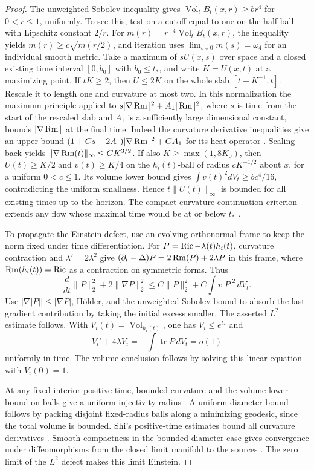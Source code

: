 \begin{proof}
The unweighted Sobolev inequality gives \(\operatorname{Vol}_t
B_t(x,r)\ge b r^4\) for \(0<r\le1\), uniformly. To see this, test
on a cutoff equal to one on the half-ball with Lipschitz constant
\(2/r\). For \(m(r)=r^{-4}\operatorname{Vol}_t B_t(x,r)\), the
inequality yields \(m(r)\ge c\sqrt{m(r/2)}\), and iteration uses
\(\lim_{s\downarrow0}m(s)=\omega_4\) for an individual smooth metric.
Take a maximum of \(sU(x,s)\) over space and a closed existing time
interval \([0,b_0]\) with \(b_0\le t_*\), and write \(K=U(x,t)\)
at a maximizing point. If \(tK\ge2\), then \(U\le2K\) on the
whole slab \([t-K^{-1},t]\). Rescale it to length one and curvature
at most two. In this normalization the maximum principle applied to
\(s|\nabla\operatorname{Rm}|^2+A_1|\operatorname{Rm}|^2\), where \(s\) is time from the start
of the rescaled slab and \(A_1\) is a sufficiently large dimensional
constant, bounds \(|\nabla\operatorname{Rm}|\) at the final time. Indeed the
curvature derivative inequalities give an upper bound
\((1+C s-2A_1)|\nabla\operatorname{Rm}|^2+C A_1\) for its heat operator
\cite[\S\S7 and 13]{Hamilton1982}. Scaling back yields
\(\|\nabla\operatorname{Rm}(t)\|_\infty\le C K^{3/2}\).
If also \(K\ge\max(1,8K_0)\), then \(U(t)\ge K/2\) and
\(v(t)\ge K/4\) on the \(h_i(t)\)-ball of radius \(cK^{-1/2}\)
about \(x\), for a uniform \(0<c\le1\). Its volume lower bound
gives \(\int v(t)^2dV_t\ge bc^4/16\), contradicting the uniform
smallness. Hence \(t\|U(t)\|_\infty\) is bounded for all existing
times up to the horizon. The compact curvature continuation criterion
extends any flow whose maximal time would be at or below \(t_*\)
\cite[Theorem~8.1]{HamiltonSingularities}.

To propagate the Einstein defect, use an evolving orthonormal frame
to keep the norm fixed under time differentiation. For
\(P=\operatorname{Ric}-\lambda(t)h_i(t)\), curvature contraction and
\(\lambda'=2\lambda^2\) give
\((\partial_t-\Delta)P=2\operatorname{Rm}(P)+2\lambda P\) in this frame, where
\(\operatorname{Rm}(h_i(t))=\operatorname{Ric}\) as a contraction on symmetric forms. Thus
\[
 \frac{d}{dt}\|P\|_2^2+2\|\nabla P\|_2^2
 \le C\|P\|_2^2+C\int v|P|^2\,dV_t.
\]
Use \(|\nabla|P||\le|\nabla P|\), H\"older, and the unweighted
Sobolev bound to absorb the last gradient contribution by taking the
initial excess smaller. The asserted \(L^2\) estimate follows. With
\(V_i(t)=\operatorname{Vol}_{h_i(t)}\), one has
\(V_i\le e^{t_*}\) and
\[
 V_i'+4\lambda V_i=-\int\operatorname{tr}P\,dV_t=o(1)
\]
uniformly in time. The volume conclusion follows by solving this
linear equation with \(V_i(0)=1\).

At any fixed interior positive time, bounded curvature and the
volume lower bound on balls give a uniform injectivity radius
\cite[Theorem~4.7]{CheegerGromovTaylor1982}. A uniform diameter
bound follows by packing disjoint fixed-radius balls along a
minimizing geodesic, since the total volume is bounded. Shi's
positive-time estimates bound all curvature derivatives
\cite{Shi1989Flow}. Smooth compactness in the bounded-diameter case
gives convergence under diffeomorphisms from the closed limit manifold
to the sources \cite{HamiltonCompactness}.
The zero limit of the \(L^2\) defect makes this limit Einstein.
\end{proof}

